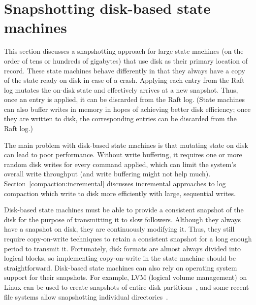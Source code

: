 \section{Snapshotting disk-based state machines}
\label{compaction:disksnapshot}

This section discusses a snapshotting approach for large state machines
(on the order of tens or hundreds of gigabytes) that use disk as their
primary location of record. 
These state machines behave differently in that they always have a copy
of the state ready on disk in case of a crash.
Applying each entry from the Raft log mutates
the on-disk state and effectively arrives at a new snapshot. Thus, once
an entry is applied, it can be discarded from the Raft log.
(State machines can also buffer writes in memory in hopes of achieving
better disk efficiency; once they are written to disk, the corresponding
entries can be discarded from the Raft log.)

The main problem with disk-based state machines is that
mutating state on disk can lead to poor performance. Without write
buffering, it requires one or more random disk writes for every command
applied, which can limit the system's overall write throughput (and
write buffering might not help much).
Section~\ref{compaction:incremental} discusses incremental approaches to
log compaction which write to disk more efficiently with large,
sequential writes.

Disk-based state machines must be able to provide a consistent
snapshot of the disk for the purpose of transmitting it to slow
followers. Although they always have a snapshot on disk, they are
continuously modifying it. Thus, they still require copy-on-write
techniques to retain a consistent snapshot for a long enough period to
transmit it. Fortunately, disk formats are almost always divided into
logical blocks, so implementing copy-on-write in the state machine
should be straightforward. Disk-based state machines can also rely on
operating system support for their snapshots. For example, LVM (logical
volume management) on Linux can be used to create snapshots of entire
disk partitions~\cite{lvm}, and some recent file systems allow
snapshotting individual directories~\cite{btrfssnapshots}.

